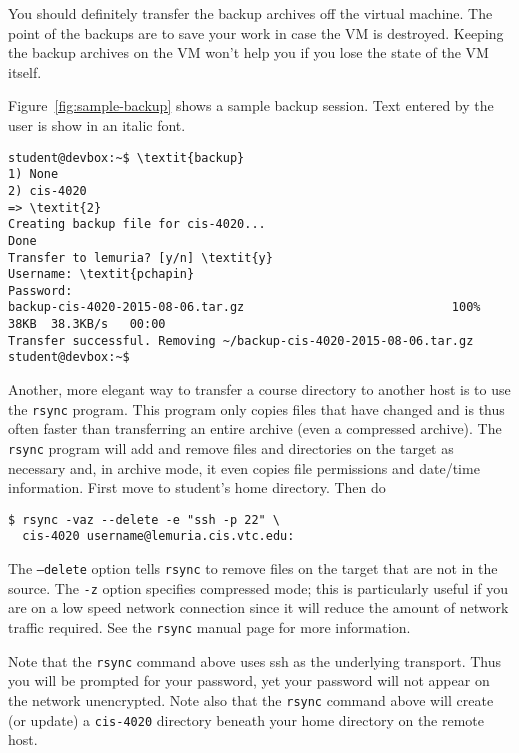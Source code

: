 \documentclass[twocolumn]{article}
\begin{document}
You should definitely transfer the backup archives off the virtual machine. The point of the
backups are to save your work in case the VM is destroyed. Keeping the backup archives on the VM
won't help you if you lose the state of the VM itself.

Figure~\ref{fig:sample-backup} shows a sample backup session. Text entered by the user is show
in an italic font.

\begin{figure*}[t]
\begin{Verbatim}[fontsize=\small, frame=single, commandchars=\\\{\}]
student@devbox:~$ \textit{backup}
1) None
2) cis-4020
=> \textit{2}
Creating backup file for cis-4020...
Done
Transfer to lemuria? [y/n] \textit{y}
Username: \textit{pchapin}
Password: 
backup-cis-4020-2015-08-06.tar.gz                             100%   38KB  38.3KB/s   00:00    
Transfer successful. Removing ~/backup-cis-4020-2015-08-06.tar.gz
student@devbox:~$
\end{Verbatim}
\caption{Sample Backup Session}
\label{fig:sample-backup}
\end{figure*}

Another, more elegant way to transfer a course directory to another host is to use the
\texttt{rsync} program. This program only copies files that have changed and is thus often
faster than transferring an entire archive (even a compressed archive). The \texttt{rsync}
program will add and remove files and directories on the target as necessary and, in archive
mode, it even copies file permissions and date/time information. First move to student's home
directory. Then do
\begin{Verbatim}
$ rsync -vaz --delete -e "ssh -p 22" \
  cis-4020 username@lemuria.cis.vtc.edu:
\end{Verbatim}

The \texttt{--delete} option tells \texttt{rsync} to remove files on the target that are not in
the source. The \texttt{-z} option specifies compressed mode; this is particularly useful if you
are on a low speed network connection since it will reduce the amount of network traffic
required. See the \texttt{rsync} manual page for more information.

Note that the \texttt{rsync} command above uses ssh as the underlying transport. Thus you will
be prompted for your password, yet your password will not appear on the network unencrypted.
Note also that the \texttt{rsync} command above will create (or update) a \texttt{cis-4020}
directory beneath your home directory on the remote host.
\end{document}
